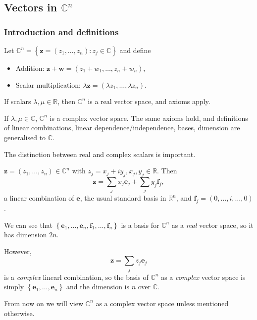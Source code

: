 \documentclass[a4paper]{article}
\begin{document}
\subsection{Vectors in $\mathbb{C}^n$}
\subsubsection{Introduction and definitions}
Let $ \mathbb{C}^n=\left\{ \mathbf{z}=(z_1,\dots,z_n):z_j\in
\mathbb{C}\right\} $ and define
\begin{itemize}
  \item Addition: $ \mathbf{z}+\mathbf{w}=(z_1+w_1,\dots,z_n+w_n) $,
  \item Scalar multiplication: $ \lambda \mathbf{z}=(\lambda
    z_1,\dots, \lambda z_n) $.
\end{itemize}
If scalars $ \lambda,\mu\in \mathbb{R} $, then $ \mathbb{C}^n $ is a
real vector space, and axioms apply.

If $ \lambda, \mu\in \mathbb{C}  $, $ \mathbb{C}^n $ is a complex
vector space. The same axioms hold, and definitions of linear
combinations, linear dependence/independence, bases, dimension are
generalised to $\mathbb{C}$.

The distinction between real and complex scalars is important.
\begin{example}
  $ \mathbf{z}=(z_1,\dots,z_n)\in \mathbb{C}^{n} $ with $
  z_j=x_j+iy_j, x_j, y_j \in \mathbb{R} $. Then
  \[
    \mathbf{z}=\sum_{j} x_j \mathbf{e}_j + \sum_{j} y_j \mathbf{f}_j,
  \]
  a linear combination of $ \mathbf{e} $, the usual standard basis in
  $\mathbb{R}^{n}$, and $ \mathbf{f}_j=(0,\dots,i,\dots,0) $.
\end{example}
We can see that $ \left\{
\mathbf{e}_1,\dots,\mathbf{e}_n,\mathbf{f}_1,\dots,\mathbf{f}_n\right\}
$ is a basis for $\mathbb{C}^{n}$ as a \textit{real} vector space, so
it has dimension $2n$.

However,
\[
  \mathbf{z}=\sum_{j}z_j \mathbf{e}_j
\]
is a \textit{complex} linearl combination, so the basis of $
\mathbb{C}^{n} $ as a \textit{complex} vector space is simply $
\left\{ \mathbf{e}_1,\dots,\mathbf{e}_n\right\} $ and the dimension
is $n$ over $ \mathbb{C} $.

From now on we will view $ \mathbb{C}^{n} $ as a complex vector space
unless mentioned otherwise.
\end{document}
